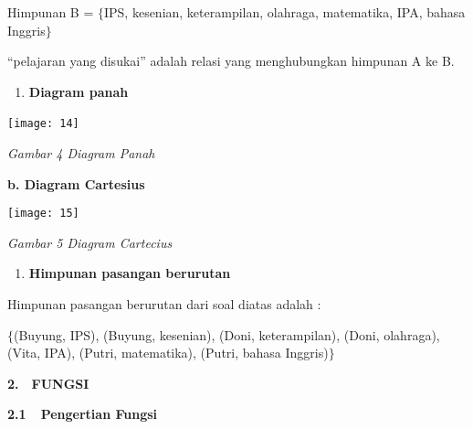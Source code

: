 \documentclass[11pt,fleqn]{book} %
\begin{document}
\noindent Himpunan B = $\{$IPS, kesenian, keterampilan, olahraga, matematika, IPA, bahasa Inggris$\}$

\noindent ``pelajaran yang disukai'' adalah relasi yang menghubungkan himpunan A ke B.

\noindent 

\noindent 

\noindent 

\noindent 

\noindent 

\noindent 

\begin{enumerate}
\item  \textbf{Diagram panah}
\end{enumerate}

\begin{center}
\noindent \texttt{[image: 14]}~
\end{center}

\noindent 

\noindent 

\noindent \textit{Gambar 4 Diagram Panah}

\noindent \textbf{b. Diagram Cartesius}

\begin{center}
\noindent \texttt{[image: 15]}
\end{center}

\noindent \textit{Gambar 5 Diagram Cartecius}

\noindent \textbf{}

\begin{enumerate}
\item \textbf{ Himpunan pasangan berurutan}
\end{enumerate}

\noindent Himpunan pasangan berurutan dari soal diatas adalah :

\noindent 

\noindent $\{$(Buyung, IPS), (Buyung, kesenian), (Doni, keterampilan), (Doni, olahraga), (Vita, IPA), (Putri, matematika), (Putri, bahasa Inggris)$\}$

\noindent 

\noindent 

\noindent \eject 

\noindent \textbf{2.}~~\textbf{FUNGSI}

\noindent \textbf{2.1~~Pengertian Fungsi}
\end{document}
